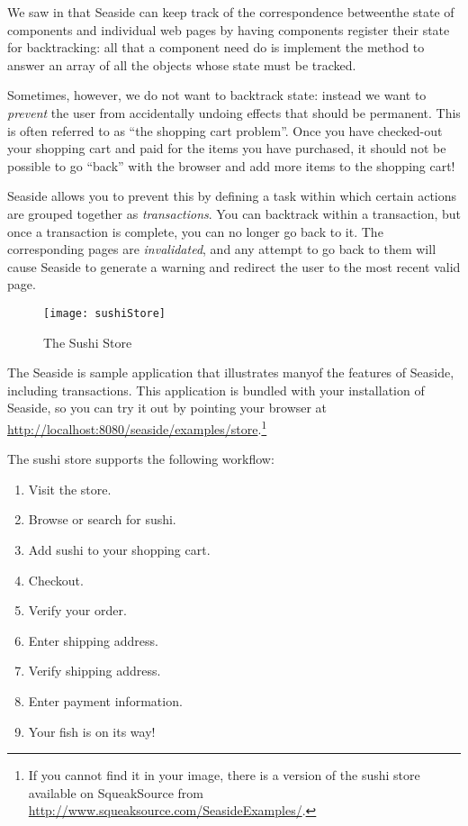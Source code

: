 \documentclass[a4paper,10pt,twoside]{book}
\begin{document}
We saw in  that Seaside can keep track of the correspondence betweenthe state of components and individual web pages by having components register their
state for backtracking:
all that a component need do is implement the method  to answer an array of
all the objects whose state must be tracked.

Sometimes, however, we do not want to backtrack state: instead we want to \emph{prevent}
the user from accidentally undoing effects that should be permanent.
This is often referred to as ``the shopping cart problem''.
Once you have checked-out your shopping cart and paid for the items you have purchased,
it should not be possible to go ``back'' with the browser and add more items to the
shopping cart!

Seaside allows you to prevent this by defining a task within which certain actions are
grouped together as \emph{transactions}.
You can backtrack within a transaction, but once a transaction is complete, you can no
longer go back to it.
The corresponding pages are \emph{invalidated}, and any attempt to go back to them will
cause Seaside to generate a warning and redirect the user to the most recent valid page.

\begin{figure}[ht]
\begin{center}
\texttt{[image: sushiStore]}
\caption{The Sushi Store}
\end{center}
\end{figure}

The Seaside  is sample application that illustrates manyof the features of Seaside, including transactions.
This application is bundled with your installation of Seaside, so you can try it out by
pointing your browser at
\url{http://localhost:8080/seaside/examples/store}.\footnote{If you cannot find it in
your image, there is a version of the sushi store available on SqueakSource from
\url{http://www.squeaksource.com/SeasideExamples/}.}

The sushi store supports the following workflow:
\begin{enumerate}[itemsep=0pt]
  \item Visit the store.
  \item Browse or search for sushi.
  \item Add sushi to your shopping cart.
  \item Checkout.
  \item Verify your order.
  \item Enter shipping address.
  \item Verify shipping address.
  \item Enter payment information.
  \item Your fish is on its way!
\end{enumerate}
\end{document}
